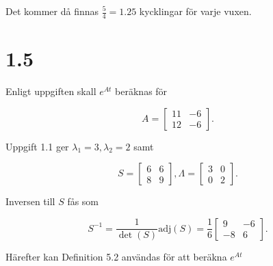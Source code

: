 \documentclass[a4paper]{article}
\newcommand{\mat}[1]{\bm{\mathit{#1}}}
\begin{document}
\noindent Det kommer då finnas $\frac 54 = 1.25$ kycklingar för varje vuxen.

\section*{1.5}

Enligt uppgiften skall $e^{\mat{A}t}$ beräknas för

\begin{equation*}
  \mat{A} = \begin{bmatrix} 11 & -6\\ 12 & -6\end{bmatrix}.
\end{equation*}

\noindent Uppgift 1.1 ger $\lambda_1 = 3, \lambda_2 = 2$ samt

\begin{equation*}
  \mat{S} = \begin{bmatrix}6 & 6\\8 & 9\end{bmatrix}, \Lambda = \begin{bmatrix}3 & 0\\0 & 2\end{bmatrix}.
\end{equation*}

\noindent Inversen till $\mat{S}$ fås som

\begin{equation*}
  \mat{S}^{-1} = \frac{1}{\det(\mat{S})}\text{adj}(\mat{S}) = \frac 16 \begin{bmatrix}9 & -6\\-8 & 6\end{bmatrix}.
\end{equation*}

\noindent Härefter kan Definition 5.2 användas för att beräkna $e^{\mat{A}t}$
\end{document}
